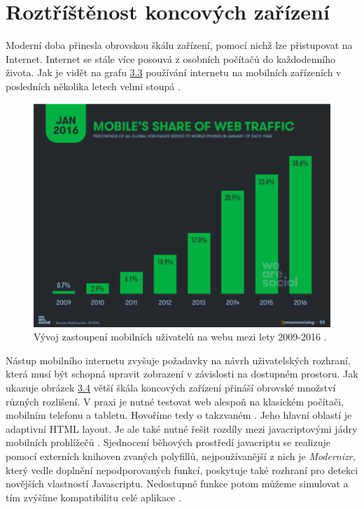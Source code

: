 \section{Roztříštěnost koncových zařízení}
Moderní doba přinesla obrovskou škálu zařízení, pomocí nichž lze přistupovat na Internet. Internet se stále více posouvá z osobních počítačů do každodenního života. Jak je vidět na grafu \hyperref[fig:mobile_popularity]{3.3} používání internetu na mobilních zařízeních v posledních několika letech velmi stoupá \cite{mobile_popularity}. 

\begin{figure}[h]
\begin{centering}
\includegraphics[scale=0.4]{obrazky/mobile_popularity}
\par\end{centering}
\caption{Vývoj zastoupení mobilních uživatelů na webu mezi lety 2009-2016 \cite{mobile_popularity}. \label{fig:mobile_popularity}}
\end{figure}
\FloatBarrier

Nástup mobilního internetu zvyšuje požadavky na návrh uživatelských rozhraní, která musí být schopná upravit zobrazení v závislosti na dostupném prostoru. Jak ukazuje obrázek \hyperref[fig:resolutions]{3.4} větší škála koncových zařízení přináší obrovské množství různých rozlišení. V praxi je nutné testovat web alespoň na klasickém počítači, mobilním telefonu a tabletu. Hovoříme tedy o takzvaném . Jeho hlavní oblastí je adaptivní HTML layout. Je ale také nutné řešit rozdíly mezi javacriptovými jádry mobilních prohlížečů \cite{responsive_design}. Sjednocení běhových prostředí javacriptu se realizuje pomocí externích knihoven zvaných polyfillů, nejpoužívanější z nich je \textit{Modernizr}, který vedle doplnění nepodporovaných funkcí, poskytuje také rozhraní pro detekci novějších vlastností Javascriptu. Nedostupné funkce potom můžeme simulovat a tím zvýšíme kompatibilitu celé aplikace \cite{modernizr}.

